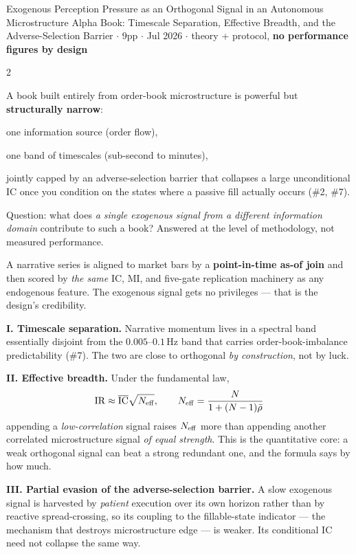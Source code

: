 \documentclass[10pt,a4paper]{article}
\begin{document}
\small

{Exogenous Perception Pressure as an Orthogonal Signal in an Autonomous Microstructure Alpha Book:
 Timescale Separation, Effective Breadth, and the Adverse-Selection Barrier}
{ $\cdot$ 9pp $\cdot$ Jul 2026 $\cdot$ theory + protocol,
 \textbf{no performance figures by design}}

\begin{multicols}{2}

A book built entirely from order-book microstructure is powerful but \textbf{structurally narrow}:
\begin{opitems}
\item one information source (order flow),
\item one band of timescales (sub-second to minutes),
\item jointly capped by an adverse-selection barrier that collapses a large unconditional IC once you
      condition on the states where a passive fill actually occurs (\#2, \#7).
\end{opitems}
Question: what does \emph{a single exogenous signal from a different information domain} contribute to
such a book? Answered at the level of methodology, not measured performance.

A narrative series is aligned to market bars by a \textbf{point-in-time as-of join} and then scored by
\emph{the same} IC, MI, and five-gate replication machinery as any endogenous feature. The exogenous
signal gets no privileges — that is the design's credibility.

\textbf{I. Timescale separation.} Narrative momentum lives in a spectral band essentially disjoint from
the $0.005$--$0.1$\,Hz band that carries order-book-imbalance predictability (\#7). The two are close to
orthogonal \emph{by construction}, not by luck.

\textbf{II. Effective breadth.} Under the fundamental law,
\[
  \operatorname{IR}\approx\overline{\mathrm{IC}}\sqrt{N_{\mathrm{eff}}},\qquad N_{\mathrm{eff}}=\frac{N}{1+(N-1)\bar{\rho}}
\]
appending a \emph{low-correlation} signal raises $N_{\mathrm{eff}}$ more than appending another correlated
microstructure signal \emph{of equal strength}. This is the quantitative core: a weak orthogonal signal
can beat a strong redundant one, and the formula says by how much.

\textbf{III. Partial evasion of the adverse-selection barrier.} A slow exogenous signal is harvested by
\emph{patient} execution over its own horizon rather than by reactive spread-crossing, so its coupling to
the fillable-state indicator — the mechanism that destroys microstructure edge — is weaker. Its
conditional IC need not collapse the same way.


\end{multicols}
\end{document}
